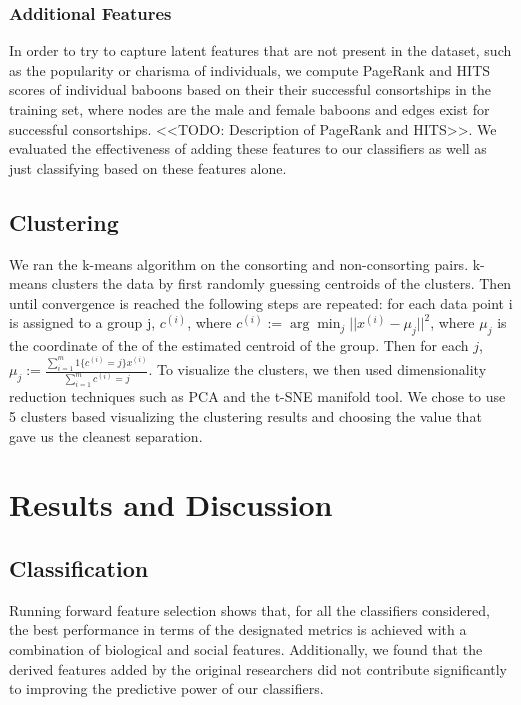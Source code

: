 \documentclass[twoside,twocolumn,paper=letter,fontsize=11pt]{article}
\begin{document}
\subsubsection*{Additional Features}

In order to try to capture latent features that are not present in the dataset,
such as the popularity or charisma of individuals, we compute PageRank and HITS
scores of individual baboons based on their their successful consortships in the
training set, where nodes are the male and female baboons and edges exist for
successful consortships.  <<TODO: Description of PageRank and HITS>>. We
evaluated the effectiveness of adding these features to our classifiers as well
as just classifying based on these features alone.

\subsection{Clustering}

We ran the k-means algorithm on the consorting and
non-consorting pairs. k-means clusters the data by first randomly guessing
centroids of the clusters. Then until convergence is reached the following steps
are repeated: for each data
point i is assigned to a group j, $c^{(i)}$, where
$c^{(i)}:=\arg\min_{j}||x^{(i)}-\mu_j||^2$, where $\mu_j$ is the coordinate of
the of the estimated centroid of the group. Then for each $j$,
$\mu_j:=\frac{\sum_{i=1}^m1\{c^{(i)}=j\}x^{(i)}}{\sum_{i=1}^m{c^{(i)}=j}}$.
To visualize the clusters, we then used dimensionality
reduction techniques such as PCA and the t-SNE manifold tool. We chose to use 5
clusters based visualizing the clustering results and choosing the value that
gave us the cleanest separation.

\section{Results and Discussion}
\subsection{Classification}

Running forward feature selection shows that, for all the classifiers
considered, the best performance in terms of the designated metrics is achieved
with a combination of biological and social features. Additionally, we found that
the derived features added by the original researchers did not contribute
significantly to improving the predictive power of our classifiers.\\
\end{document}
